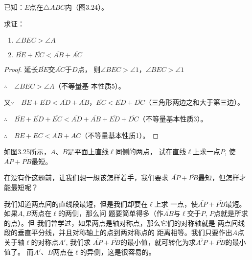 \begin{example}
    已知：$E$点在$\triangle ABC$内（图3.24）。

求证： \begin{enumerate}
    \item $\angle BEC>\angle A$
    \item $\overline{BE}+\overline{EC}<\overline{AB}+\overline{AC}$
\end{enumerate} 
\end{example}

\begin{proof}
    延长$\overline{BE}$交$\overline{AC}$于$D$点，
则$\angle BEC>\angle 1$，$\angle BEC>\angle 1$

$\therefore\quad \angle BEC>\angle A$（不等量基
本性质5）。

又$\because\quad \overline{BE}+\overline{ED}<\overline{AD}+\overline{AB}$，$\overline{EC}<\overline{ED}+\overline{DC}$（三角形两边之和大于第三边）。

$\therefore\quad \overline{BE}+\overline{ED}+\overline{EC}<\overline{AD}+\overline{AB}+\overline{ED}+\overline{DC}$（不等量基本性质3）。

$\therefore\quad \overline{BE}+\overline{EC}<\overline{AB}+\overline{AC}$（不等量基本性质1）。
\end{proof}

\begin{example}
如图3.25所示，$A$、$B$是平面上直线$\ell$同侧的两点，
试在直线$\ell$上求一点$P$, 使$\overline{AP}+\overline{PB}$最短。

在没有作这题前，让我们想一想该怎样着手，我们要求
$\overline{AP}+\overline{PB}$最短，但怎样才能最短呢？

我们知道两点间的直线段最短，但是我们却要在$\ell$上求
一点，使$\overline{AP}+\overline{PB}$最短。如果$A,B$两点在$\ell$的两侧，那么问
题要简单得多（作$\overline{AB}$与$\ell$交于$P$, $P$点就是所求的点）。但
我们曾学过，如果两点是轴对称点，那么它们的对称轴就是
两点间线段的垂直平分线，并且对称轴上的点到两对称点的
距离相等。我们只要作出$A$点关于轴$\ell$的对称点$A'$, 我们求
$\overline{AP}+\overline{PB}$的最小值，就可转化为求$\overline{A'P}+\overline{PB}$的最小值了。
而$A'$、$B$两点在$\ell$的异侧，这是很容易的。

\begin{figure}[htp]
    \centering
{}
    \caption{}
\end{figure}
\end{example}


